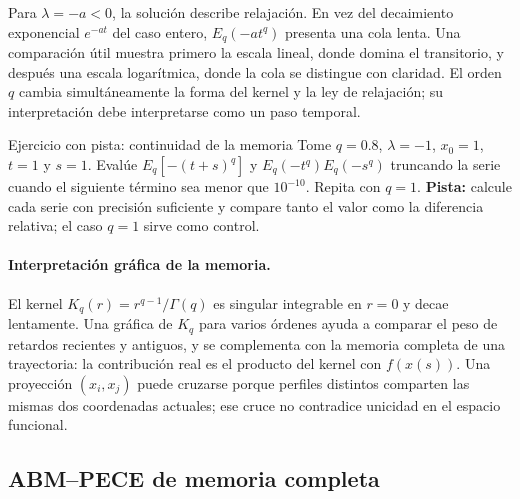 Para $\lambda=-a<0$, la solución describe relajación. En vez del decaimiento
exponencial $e^{-at}$ del caso entero, $E_q(-at^q)$ presenta una cola lenta. Una
comparación útil muestra primero la escala lineal, donde domina el transitorio, y
después una escala logarítmica, donde la cola se distingue con claridad. El orden
$q$ cambia simultáneamente la forma del kernel y la ley de relajación; su interpretación debe
interpretarse como un paso temporal.

\begin{activitybox}{Ejercicio con pista: continuidad de la memoria}
Tome $q=0.8$, $\lambda=-1$, $x_0=1$, $t=1$ y $s=1$. Evalúe
$E_q[-(t+s)^q]$ y $E_q(-t^q)E_q(-s^q)$ truncando la serie cuando el siguiente
término sea menor que $10^{-10}$. Repita con $q=1$.
\textbf{Pista:} calcule cada serie con precisión suficiente y compare tanto el valor
como la diferencia relativa; el caso $q=1$ sirve como control.
\end{activitybox}

\paragraph{Interpretación gráfica de la memoria.}
El kernel $K_q(r)=r^{q-1}/\Gamma(q)$ es singular integrable en $r=0$ y decae
lentamente. Una gráfica de $K_q$ para varios órdenes ayuda a comparar el peso de
retardos recientes y antiguos, y se complementa con la memoria completa de una trayectoria:
la contribución real es el producto del kernel con $f(x(s))$. Una proyección
$(x_i,x_j)$ puede cruzarse porque perfiles distintos comparten las mismas dos
coordenadas actuales; ese cruce no contradice unicidad en el espacio funcional.


\subsection{ABM--PECE de memoria completa}


